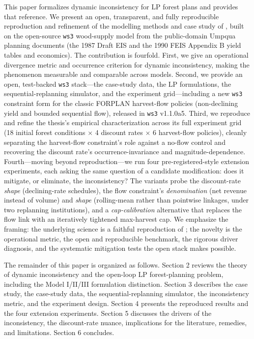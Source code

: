 This paper formalizes dynamic inconsistency for LP forest plans and provides that reference. We present an open, transparent, and fully reproducible reproduction and refinement of the modelling methods and case study of \citet{daugherty1991credibility}, built on the open-source \texttt{ws3} wood-supply model \citep{paradis2026ws3} from the public-domain Umpqua planning documents (the 1987 Draft EIS and the 1990 FEIS Appendix B yield tables and economics). The contribution is fourfold. First, we give an operational divergence metric and occurrence criterion for dynamic inconsistency, making the phenomenon measurable and comparable across models. Second, we provide an open, test-backed \texttt{ws3} stack---the case-study data, the LP formulations, the sequential-replanning simulator, and the experiment grid---including a new \texttt{ws3} constraint form for the classic FORPLAN harvest-flow policies (non-declining yield and bounded sequential flow), released in \texttt{ws3} v1.1.0a5. Third, we reproduce and refine the thesis's empirical characterization across its full experiment grid (18 initial forest conditions $\times$ 4 discount rates $\times$ 6 harvest-flow policies), cleanly separating the harvest-flow constraint's role against a no-flow control and recovering the discount rate's occurrence-invariance and magnitude-dependence. Fourth---moving beyond reproduction---we run four pre-registered-style extension experiments, each asking the same question of a candidate modification: does it mitigate, or eliminate, the inconsistency? The variants probe the discount-rate \emph{shape} (declining-rate schedules), the flow constraint's \emph{denomination} (net revenue instead of volume) and \emph{shape} (rolling-mean rather than pointwise linkages, under two replanning institutions), and a \emph{cap-calibration} alternative that replaces the flow link with an iteratively tightened max-harvest cap. We emphasize the framing: the underlying science is a faithful reproduction of \citet{daugherty1991credibility}; the novelty is the operational metric, the open and reproducible benchmark, the rigorous driver diagnosis, and the systematic mitigation tests the open stack makes possible.

The remainder of this paper is organized as follows. Section 2 reviews the theory of dynamic inconsistency and the open-loop LP forest-planning problem, including the Model I/II/III formulation distinction. Section 3 describes the case study, the case-study data, the sequential-replanning simulator, the inconsistency metric, and the experiment design. Section 4 presents the reproduced results and the four extension experiments. Section 5 discusses the drivers of the inconsistency, the discount-rate nuance, implications for the literature, remedies, and limitations. Section 6 concludes.
